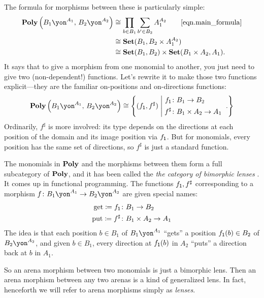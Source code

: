 \documentclass[Book-Poly]{subfiles}
\begin{document}
The formula for morphisms between these is particularly simple:
\begin{align*}
  \poly\left(B_1\yon^{A_1},\,B_2\yon^{A_2}\right) &\iso \prod_{b \in B_1} \sum_{b' \in B_2} A_1^{A_2} \tag*{\eqref{eqn.main_formula}} \\
  &\iso \smset(B_1, B_2 \times A_1^{A_2}) \\
  &\iso \smset(B_1,B_2)\times\smset(B_1\times A_2,A_1).
\end{align*}
It says that to give a morphism from one monomial to another, you just need to give two (non-dependent!) functions. Let's rewrite it to make those two functions explicit---they are the familiar on-positions and on-directions functions:
\[
  \poly\left(B_1\yon^{A_1},\,B_2\yon^{A_2}\right)
  \iso
  \left\{
    (f_\1,f^\sharp)
  \;\middle|\;
  	\parbox{1.2in}{
    $
    \begin{aligned}
  	  f_\1&\colon B_1\to B_2\\
  	  f^\sharp&\colon B_1\times A_2\to A_1
    \end{aligned}
    $
  }.
  \right\}
\]
Ordinarily, $f^\sharp$ is more involved: its type depends on the directions at each position of the domain and its image position via $f_{\textsf{1}}$.
But for monomials, every position has the same set of directions, so $f^\sharp$ is just a standard function.

The monomials in $\mathbf{Poly}$ and the morphisms between them form a full subcategory of $\mathbf{Poly}$, and it has been called the \emph{the category of bimorphic lenses} \cite{hedges2018limits}. It comes up in functional programming. The functions $f_{\textsf{1}}, f^\sharp$ corresponding to a morphism $f \colon B_1\yon^{A_1}\to B_2\yon^{A_2}$ are given special names:
\begin{equation}\label{eqn.bimorphic_lens}
\begin{aligned}
	\mathrm{get}\coloneqq f_{\textsf{1}} &\colon B_1\to B_2\\
	\mathrm{put}\coloneqq f^\sharp &\colon B_1\times A_2\to A_1
\end{aligned}
\end{equation}
The idea is that each position $b \in B_1$ of $B_1\yon^{A_1}$ ``gets'' a position $f_{\textsf{1}}(b) \in B_2$ of $B_2\yon^{A_2}$, and given $b \in B_1$, every direction at $f_{\textsf{1}}(b)$ in $A_2$ ``puts'' a direction back at $b$ in $A_1$.

So an arena morphism between two monomials is just a bimorphic lens.
Then an arena morphism between any two arenas is a kind of generalized lens.
In fact, henceforth we will refer to arena morphisms simply as \emph{lenses}.
\end{document}
